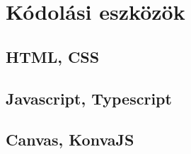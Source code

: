 \chapter{Kódolási eszközök}\label{sect:CodeTool}
\section{HTML, CSS}

\section{Javascript, Typescript}


\section{Canvas, KonvaJS}
